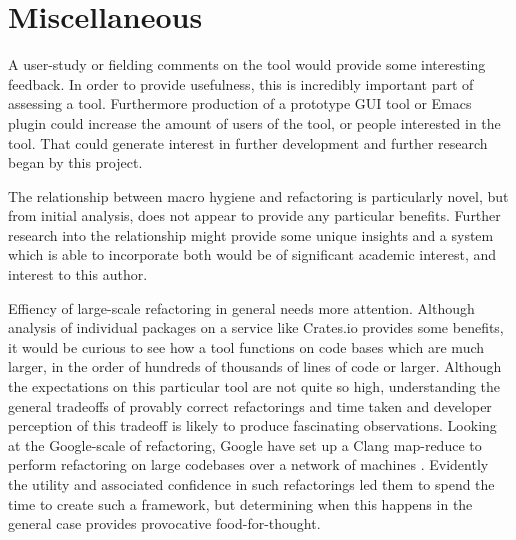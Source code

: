 \section{Miscellaneous}
A user-study or fielding comments on the tool would provide some interesting feedback. In order to provide usefulness, this is incredibly important part of assessing a tool. Furthermore production of a prototype GUI tool or Emacs plugin could increase the amount of users of the tool, or people interested in the tool. That could generate interest in further development and further research began by this project.

The relationship between macro hygiene and refactoring is particularly novel, but from initial analysis, does not appear to provide any particular benefits. Further research into the relationship might provide some unique insights and a system which is able to incorporate both would be of significant academic interest, and interest to this author.

Effiency of large-scale refactoring in general needs more attention. Although analysis of individual packages on a service like Crates.io provides some benefits, it would be curious to see how a tool functions on code bases which are much larger, in the order of hundreds of thousands of lines of code or larger. Although the expectations on this particular tool are not quite so high, understanding the general tradeoffs of provably correct refactorings and time taken and developer perception of this tradeoff is likely to produce fascinating observations. Looking at the Google-scale of refactoring, Google have set up a Clang map-reduce to perform refactoring on large codebases over a network of machines \cite{carruth2011clang}. Evidently the utility and associated confidence in such refactorings led them to spend the time to create such a framework, but determining when this happens in the general case provides provocative food-for-thought.

